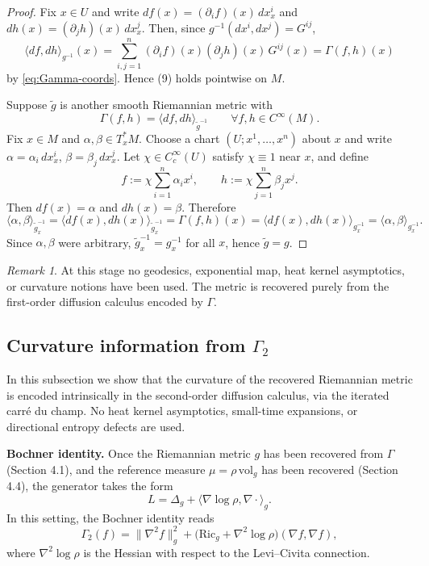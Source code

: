 \documentclass[11pt]{amsart}
\theoremstyle{definition}
\theoremstyle{remark}
\newtheorem{remark}[theorem]{Remark}
\begin{document}
\begin{proof}
Fix $x\in U$ and write $df(x)=(\partial_i f)(x)\,dx^i_x$ and $dh(x)=(\partial_j h)(x)\,dx^j_x$.
Then, since $g^{-1}(dx^i,dx^j)=G^{ij}$,
\[
\langle df,dh\rangle_{g^{-1}}(x)
=\sum_{i,j=1}^n (\partial_i f)(x)(\partial_j h)(x)\,G^{ij}(x)
=\Gamma(f,h)(x)
\]
by \eqref{eq:Gamma-coords}. Hence (9) holds pointwise on $M$.

Suppose $\tilde g$ is another smooth Riemannian metric with
\[
\Gamma(f,h)=\langle df,dh\rangle_{\tilde g^{-1}}
\qquad\forall f,h\in C^\infty(M).
\]
Fix $x\in M$ and $\alpha,\beta\in T_x^*M$. Choose a chart $(U;x^1,\dots,x^n)$ about $x$ and write
$\alpha=\alpha_i\,dx^i_x$, $\beta=\beta_j\,dx^j_x$. Let $\chi\in C_c^\infty(U)$ satisfy $\chi\equiv 1$
near $x$, and define
\[
f:=\chi\sum_{i=1}^n \alpha_i x^i,\qquad h:=\chi\sum_{j=1}^n \beta_j x^j.
\]
Then $df(x)=\alpha$ and $dh(x)=\beta$. Therefore
\[
\langle \alpha,\beta\rangle_{\tilde g^{-1}_x}
=\langle df(x),dh(x)\rangle_{\tilde g^{-1}_x}
=\Gamma(f,h)(x)
=\langle df(x),dh(x)\rangle_{g^{-1}_x}
=\langle \alpha,\beta\rangle_{g^{-1}_x}.
\]
Since $\alpha,\beta$ were arbitrary, $\tilde g^{-1}_x=g^{-1}_x$ for all $x$, hence $\tilde g=g$.
\end{proof}

\begin{remark}
At this stage no geodesics, exponential map, heat kernel asymptotics, or curvature notions
have been used.  The metric is recovered purely from the first-order diffusion calculus
encoded by $\Gamma$.
\end{remark}


\subsection{Curvature information from $\Gamma_2$}
\label{subsec:recover-curvature}

In this subsection we show that the curvature of the recovered Riemannian metric is encoded
intrinsically in the second-order diffusion calculus, via the iterated carré du champ.
No heat kernel asymptotics, small-time expansions, or directional entropy defects are used.

\medskip
\noindent\textbf{Bochner identity.}
Once the Riemannian metric $g$ has been recovered from $\Gamma$ (Section 4.1),
and the reference measure $\mu=\rho\,\mathrm{vol}_g$ has been recovered
(Section 4.4), the generator takes the form
\[
L=\Delta_g+\langle\nabla\log\rho,\nabla\cdot\rangle_g.
\]
In this setting, the Bochner identity reads
\begin{equation}\label{eq:Bochner-BE}
\Gamma_2(f)
=
\|\nabla^2 f\|_g^2
+
\big(\mathrm{Ric}_g+\nabla^2\log\rho\big)(\nabla f,\nabla f),
\end{equation}
where $\nabla^2\log\rho$ is the Hessian with respect to the Levi--Civita connection.
\end{document}
